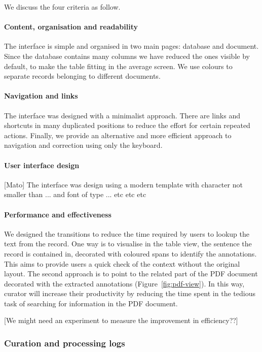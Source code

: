 \documentclass[a4paper]{article}
\begin{document}
We discuss the four criteria as follow. 
\paragraph{Content, organisation and readability} The interface is simple and organised in two main pages: database and document. Since the database contains many columns we have reduced the ones visible by default, to make the table fitting in the average screen. We use colours to separate records belonging to different documents. 

\paragraph{Navigation and links} The interface was designed with a minimalist approach. 
There are links and shortcuts in many duplicated positions to reduce the effort for certain repeated actions.
Finally, we provide an alternative and more efficient approach to navigation and correction using only the keyboard. 

\paragraph{User interface design}
[Mato] The interface was design using a modern template with character not smaller than ... and font of type ... etc etc etc 

\paragraph{Performance and effectiveness}
We designed the transitions to reduce the time required by users to lookup the text from the record. 
One way is to visualise in the table view, the sentence the record is contained in, decorated with coloured spans to identify the annotations. This aims to provide users a quick check of the context without the original layout. 
The second approach is to point to the related part of the PDF document decorated with the extracted annotations (Figure~\ref{fig:pdf-view}). In this way, curator will increase their productivity by reducing the time spent in the tedious task of searching for information in the PDF document. 
 
[We might need an experiment to measure the improvement in efficiency??]




\subsubsection{Curation and processing logs}
\end{document}
